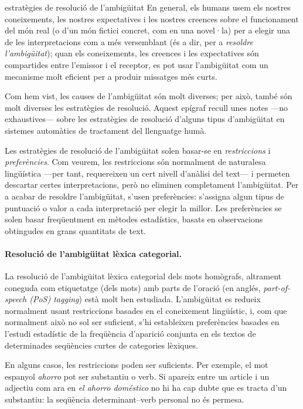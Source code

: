\begin{persabermes}{estratègies de resolució de l'ambigüitat}
  En general, els humans usem els nostres coneixements, les nostres
  expectatives i les nostres creences sobre el funcionament del món
  real (o d'un món fictici concret, com en una novel·la) per a elegir
  una de les interpretacions com a més versemblant (és a dir, per a
  \emph{resoldre l'ambigüitat}); quan els coneixements, les creences i
  les expectatives són compartides entre l'emissor i el receptor, es
  pot usar l'ambigüitat com un mecanisme molt eficient per a produir
  missatges més curts.

  Com hem vist, les causes de l'ambigüitat són molt diverses; per
  això, també són molt diverses les estratègies de resolució. Aquest
  epígraf recull unes notes ---no exhaus\-tives--- sobre les
  estratègies de resolució d'alguns tipus d'ambigüitat en sistemes
  automàtics de tractament del llenguatge humà.

  Les estratègies de resolució de l'ambigüitat solen basar-se en
  \emph{restriccions} i \emph{preferències}. Com veurem, les
  restriccions són normalment de naturalesa lingüística ---per tant,
  requereixen un cert nivell d'anàlisi del text--- i permeten
  descartar certes interpretacions, però no eliminen completament
  l'ambigüitat.  Per a acabar de resoldre l'ambigüitat, s'usen
  preferències: s'assigna algun tipus de puntuació o valor a cada
  interpretació per elegir la millor. Les preferències se solen basar
  freqüentment en mètodes estadístics, basats en observacions
  obtingudes en grans quantitats de text.

  \paragraph{Resolució de l'ambigüitat lèxica categorial.}
  \label{s3:reshom}
  La resolució de l'ambigüitat lèxica categorial dels mots homògrafs,
  altrament coneguda com etiquetatge (dels mots) amb parts de l'oració
  (en anglés, \emph{part-of-speech (PoS) tagging}) està molt ben
  estudiada.  L'ambigüitat es redueix normalment usant restriccions
  basades en el coneixement lingüístic, i, com que normalment això no
  sol ser suficient, s'hi estableixen preferències basades en l'estudi
  estadístic de la freqüència d'aparició conjunta en els textos de
  determinades seqüències curtes de categories lèxiques.

  En alguns casos, les restriccions poden ser suficients. Per exemple,
  el mot espanyol \emph{ahorro} pot ser substantiu o verb. Si apareix
  entre un article i un adjectiu com ara en \emph{el ahorro doméstico}
  no hi ha cap dubte que es tracta d'un substantiu: la seqüència
  determinant--verb personal no és permesa.


\end{persabermes}
